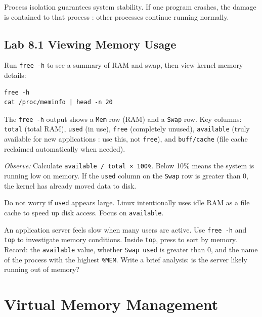 \begin{notebox}
Process isolation guarantees system stability. If one program crashes, the damage
is contained to that process : other processes continue running normally.
\end{notebox}

\subsection*{Lab 8.1 Viewing Memory Usage}

Run \texttt{free -h} to see a summary of RAM and swap, then view kernel memory
details:

\begin{lstlisting}[caption={Memory summary and details}]
free -h
cat /proc/meminfo | head -n 20
\end{lstlisting}

The \texttt{free -h} output shows a \texttt{Mem} row (RAM) and a \texttt{Swap}
row. Key columns: \texttt{total} (total RAM), \texttt{used} (in use), \texttt{free}
(completely unused), \texttt{available} (truly available for new applications :
use this, not \texttt{free}), and \texttt{buff/cache} (file cache reclaimed
automatically when needed).

\textit{Observe:} Calculate \texttt{available / total × 100\%}. Below 10\% means
the system is running low on memory. If the \texttt{used} column on the \texttt{Swap}
row is greater than 0, the kernel has already moved data to disk.

\begin{tipbox}
Do not worry if \texttt{used} appears large. Linux intentionally uses idle RAM as
a file cache to speed up disk access. Focus on \texttt{available}.
\end{tipbox}

\begin{challengebox}
An application server feels slow when many users are active. Use \texttt{free -h}
and \texttt{top} to investigate memory conditions. Inside \texttt{top}, press
 to sort by memory. Record: the \texttt{available} value, whether
\texttt{Swap used} is greater than 0, and the name of the process with the highest
\texttt{\%MEM}. Write a brief analysis: is the server likely running out of memory?
\end{challengebox}

\section{Virtual Memory Management}

